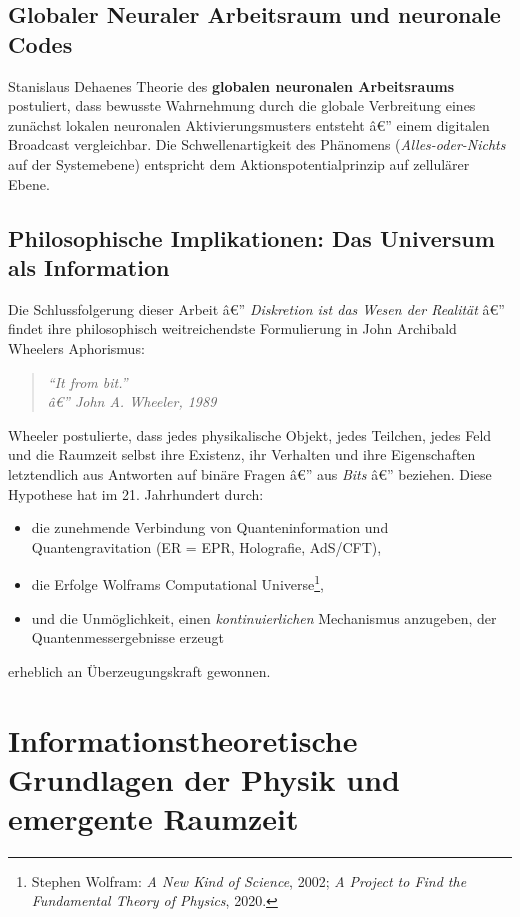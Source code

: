﻿\documentclass[12pt,a4paper,titlepage]{report}
\begin{document}
\subsection{Globaler Neuraler Arbeitsraum und neuronale Codes}

Stanislaus Dehaenes Theorie des \textbf{globalen neuronalen Arbeitsraums}
postuliert, dass bewusste Wahrnehmung durch die globale Verbreitung eines
zunächst lokalen neuronalen Aktivierungsmusters entsteht â€” einem digitalen
Broadcast vergleichbar. Die Schwellenartigkeit des Phänomens (\emph{Alles-oder-Nichts}
auf der Systemebene) entspricht dem Aktionspotentialprinzip auf zellulärer Ebene.

\subsection{Philosophische Implikationen: Das Universum als Information}

Die Schlussfolgerung dieser Arbeit â€” \emph{Diskretion ist das Wesen der Realität}
â€” findet ihre philosophisch weitreichendste Formulierung in John Archibald Wheelers
Aphorismus:
\begin{quote}
    \itshape ``It from bit.'' \\[0.3em]
    \hfill â€” \textit{John A. Wheeler, 1989}
\end{quote}
Wheeler postulierte, dass jedes physikalische Objekt, jedes Teilchen, jedes
Feld und die Raumzeit selbst ihre Existenz, ihr Verhalten und ihre Eigenschaften
letztendlich aus Antworten auf binäre Fragen â€” aus \emph{Bits} â€” beziehen.
Diese Hypothese hat im 21. Jahrhundert durch:
\begin{itemize}[leftmargin=2em]
    \item die zunehmende Verbindung von Quanteninformation und Quantengravitation
        (ER = EPR, Holografie, AdS/CFT),
    \item die Erfolge Wolframs Computational Universe\footnote{Stephen Wolfram:
        \emph{A New Kind of Science}, 2002; \emph{A Project to Find the
        Fundamental Theory of Physics}, 2020.},
    \item und die Unmöglichkeit, einen \emph{kontinuierlichen} Mechanismus
        anzugeben, der Quantenmessergebnisse erzeugt
\end{itemize}
erheblich an Überzeugungskraft gewonnen.

\section{Informationstheoretische Grundlagen der Physik und emergente Raumzeit}
\end{document}
